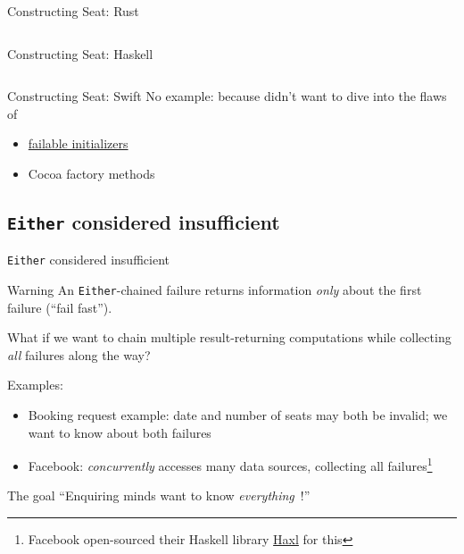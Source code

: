\begin{frame}{Constructing Seat: Rust}
  \inputminted{rust}{seats.rs}
\end{frame}

\begin{frame}{Constructing Seat: Haskell}
  \inputminted{haskell}{Seats.hs}
\end{frame}

\begin{frame}{Constructing Seat: Swift}
  No example: because didn't want to dive into the flaws of
  \begin{itemize}
  \item \href{https://developer.apple.com/swift/blog/?id=17}{failable
    initializers}
  \item Cocoa factory methods
  \end{itemize}
\end{frame}

\subsection{\texttt{Either} considered insufficient}

\begin{frame}{\texttt{Either} considered insufficient}
  \begin{alertblock}{Warning}
    An \texttt{Either}-chained failure returns information \emph{only}
    about the first failure (``fail fast'').

    What if we want to chain multiple result-returning computations
    while collecting \emph{all} failures along the way?
  \end{alertblock}

  Examples:
  \begin{itemize}
  \item Booking request example: date and number of seats may both be invalid; we want to know about both failures
  \item Facebook: \emph{concurrently} accesses many data sources, collecting all failures\footnote{Facebook open-sourced their Haskell library \href{https://github.com/facebook/Haxl}{Haxl} for this}
  \end{itemize}

  \begin{alertblock}{The goal}
    ``Enquiring minds want to know \emph{everything}\ !''
  \end{alertblock}
\end{frame}

